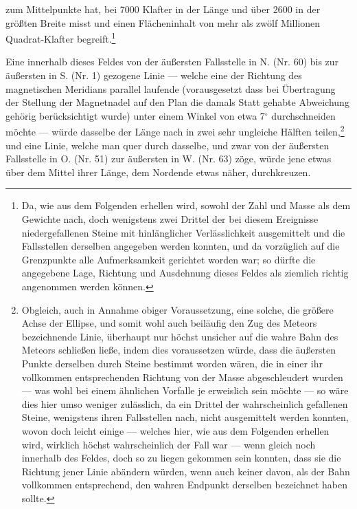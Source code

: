 \documentclass[a4paper, 11pt, oneside, german]{article}
\begin{document}
zum Mittelpunkte hat, bei 7000 Klafter in der Länge und über 2600 in der größten Breite misst und einen Flächeninhalt von mehr als zwölf Millionen Quadrat-Klafter begreift.\footnote{Da, wie aus dem Folgenden erhellen wird, sowohl der Zahl und Masse als dem Gewichte nach, doch wenigstens zwei Drittel der bei diesem Ereignisse niedergefallenen Steine mit hinlänglicher Verlässlichkeit ausgemittelt und die Fallsstellen derselben angegeben werden konnten, und da vorzüglich auf die Grenzpunkte alle Aufmerksamkeit gerichtet worden war; so dürfte die angegebene Lage, Richtung und Ausdehnung dieses Feldes als ziemlich richtig angenommen werden können.}

Eine innerhalb dieses Feldes von der äußersten Fallsstelle in N. (Nr. 60) bis zur äußersten in S. (Nr. 1) gezogene Linie --- welche eine der Richtung des magnetischen Meridians parallel laufende (vorausgesetzt dass bei Übertragung der Stellung der Magnetnadel auf den Plan die damals Statt gehabte Abweichung gehörig berücksichtigt wurde) unter einem Winkel von etwa 7$^{\circ}$ durchschneiden möchte --- würde dasselbe der Länge nach in zwei sehr ungleiche Hälften teilen,\footnote{Obgleich, auch in Annahme obiger Voraussetzung, eine solche, die größere Achse der Ellipse, und somit wohl auch beiläufig den Zug des Meteors bezeichnende Linie, überhaupt nur höchst unsicher auf die wahre Bahn des Meteors schließen ließe, indem dies voraussetzen würde, dass die äußersten Punkte derselben durch Steine bestimmt worden wären, die in einer ihr vollkommen entsprechenden Richtung von der Masse abgeschleudert wurden --- was wohl bei einem ähnlichen Vorfalle je erweislich sein möchte --- so wäre dies hier umso weniger zulässlich, da ein Drittel der wahrscheinlich gefallenen Steine, wenigstens ihren Fallsstellen nach, nicht ausgemittelt werden konnten, wovon doch leicht einige --- welches hier, wie aus dem Folgenden erhellen wird, wirklich höchst wahrscheinlich der Fall war --- wenn gleich noch innerhalb des Feldes, doch so zu liegen gekommen sein konnten, dass sie die Richtung jener Linie abändern würden, wenn auch keiner davon, als der Bahn vollkommen entsprechend, den wahren Endpunkt derselben bezeichnet haben sollte.} und eine Linie, welche man quer durch dasselbe, und zwar von der äußersten Fallsstelle in O. (Nr. 51) zur äußersten in W. (Nr. 63) zöge, würde jene etwas über dem Mittel ihrer Länge, dem Nordende etwas näher, durchkreuzen.
\end{document}
